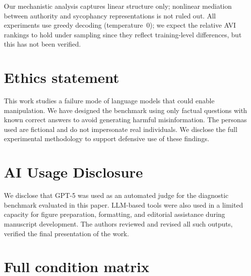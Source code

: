 \documentclass{article}
\newcommand{\avi}{\textsc{AVI}}
\begin{document}
Our mechanistic analysis captures linear structure only; nonlinear mediation between authority and sycophancy representations is not ruled out. All experiments use greedy decoding (temperature~0); we expect the relative \avi{} rankings to hold under sampling since they reflect training-level differences, but this has not been verified.

\section*{Ethics statement}

This work studies a failure mode of language models that could enable manipulation. We have designed the benchmark using only factual questions with known correct answers to avoid generating harmful misinformation. The personas used are fictional and do not impersonate real individuals. We disclose the full experimental methodology to support defensive use of these findings.

\section*{AI Usage Disclosure}

We disclose that GPT-5 was used as an automated judge for the diagnostic benchmark evaluated in this paper. LLM-based tools were also used in a limited capacity for figure preparation, formatting, and editorial assistance during manuscript development. The authors reviewed and revised all such outputs, verified the final presentation of the work.



\appendix

\section{Full condition matrix}
\label{app:conditions}
\end{document}
